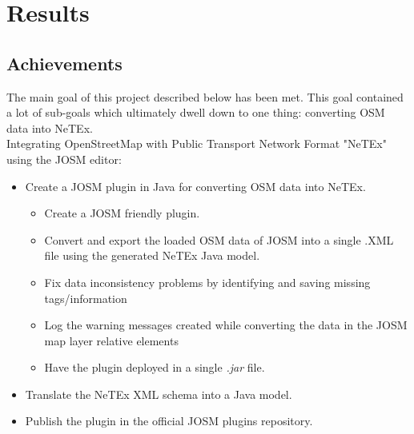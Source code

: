 \chapter{Results}
\section{Achievements}
The main goal of this project described below has been met. This goal contained a lot of sub-goals which ultimately dwell down to one thing: converting OSM data into NeTEx.\\
\newline
Integrating OpenStreetMap with Public Transport Network Format "NeTEx" using the JOSM editor:
\begin{itemize}
	\item{Create a JOSM plugin in Java for converting OSM data into NeTEx.}
	\begin{itemize}
		\item{Create a JOSM friendly plugin.}
		\item{Convert and export the loaded OSM data of JOSM into a single .XML file using the generated NeTEx Java model.}
		\item{Fix data inconsistency problems by identifying and saving missing tags/information}
		\item{Log the warning messages created while converting the data in the JOSM map layer relative elements}
		\item{Have the plugin deployed in a single \textit{.jar} file.}
	\end{itemize}
	\item{Translate the NeTEx XML schema into a Java model.}
	\item{Publish the plugin in the official JOSM plugins repository.}
\end{itemize}
\newpage
